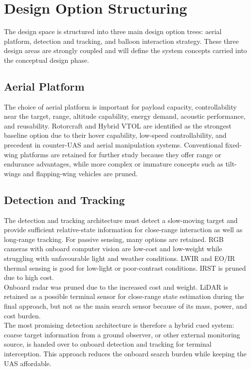 \section*{Design Option Structuring}

The design space is structured into three main design option trees: aerial platform, detection and tracking, and balloon interaction strategy. These three design areas are strongly coupled and will define the system concepts carried into the conceptual design phase.

\subsection*{Aerial Platform}


The choice of aerial platform is important for payload capacity, controllability near the target, range, altitude capability, energy demand, acoustic performance, and reusability. Rotorcraft and Hybrid VTOL are identified as the strongest baseline option due to their hover capability, low-speed controllability, and precedent in counter-UAS and aerial manipulation systems. Conventional fixed-wing platforms are retained for further study because they offer range or endurance advantages, while more complex or immature concepts such as tilt-wings and flapping-wing vehicles are pruned.

\subsection*{Detection and Tracking}

The detection and tracking architecture must detect a slow-moving target and provide sufficient relative-state information for close-range interaction as well as long-range tracking. 
For passive sensing, many options are retained. RGB cameras with onboard computer vision are low-cost and low-weight while struggling with unfavourable light and weather conditions. LWIR and EO/IR thermal sensing is good for low-light or poor-contrast conditions. IRST is pruned due to high cost.
\\

Onboard radar was pruned due to the increased cost and weight.
LiDAR is retained as a possible terminal sensor for close-range state estimation during the final approach, but not as the main search sensor because of its mass, power, and cost burden.
\\

The most promising detection architecture is therefore a hybrid cued system: coarse target information from a ground observer, or other external monitoring source, is handed over to onboard detection and tracking for terminal interception. This approach reduces the onboard search burden while keeping the UAS affordable.

